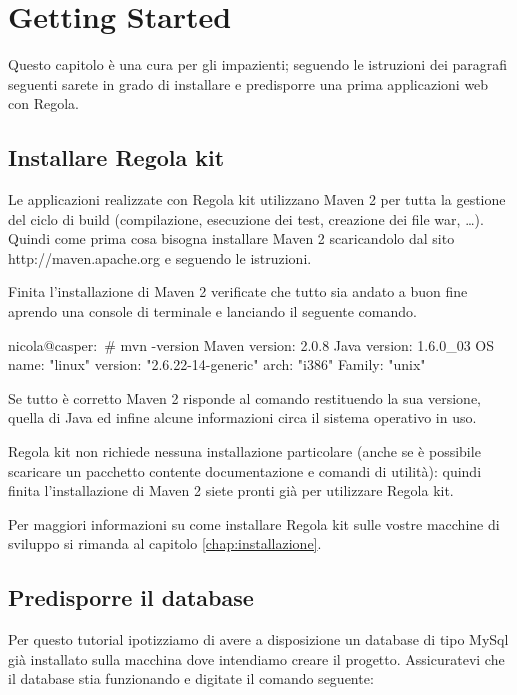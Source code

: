\chapter{Getting Started}

Questo capitolo è una cura per gli impazienti; seguendo le istruzioni dei paragrafi seguenti sarete in grado di installare e predisporre una prima applicazioni web con Regola.

\section{Installare Regola kit}
Le applicazioni realizzate con Regola kit utilizzano Maven 2 per tutta la gestione del ciclo di build (compilazione, esecuzione dei test, creazione dei file war, \ldots). Quindi come prima cosa bisogna installare Maven 2 
scaricandolo dal sito  {http://maven.apache.org} e seguendo le istruzioni.

Finita l'installazione di Maven 2 verificate che tutto sia andato a buon fine aprendo una console di terminale e lanciando il seguente comando.

\begin{bash}
nicola@casper:~# mvn -version
Maven version: 2.0.8
Java version: 1.6.0_03
OS name: "linux" version: "2.6.22-14-generic" arch: "i386" Family: "unix"
\end{bash}

Se tutto è corretto Maven 2 risponde al comando restituendo la sua versione, quella di Java ed infine alcune informazioni circa il sistema operativo in uso.

Regola kit non richiede nessuna installazione particolare (anche se è possibile scaricare un pacchetto contente documentazione e comandi di utilità): quindi finita l'installazione di Maven 2 siete pronti già per utilizzare Regola kit.


\begin{nota}
Per maggiori informazioni su come installare Regola kit sulle vostre macchine di sviluppo si rimanda al capitolo  \vref{chap:installazione}.
\end{nota}


\section{Predisporre il database}
Per questo tutorial ipotizziamo di avere a disposizione un database di tipo MySql già installato sulla macchina dove intendiamo creare il progetto. Assicuratevi che il database stia funzionando e digitate il comando seguente:

